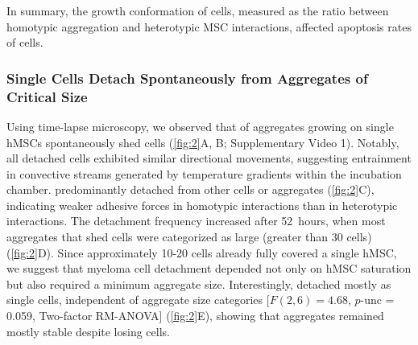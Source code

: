 In summary, the growth conformation of \INA cells, measured as the ratio between
homotypic aggregation and heterotypic MSC interactions, affected apoptosis rates
of \INA cells.



\subsubsection*{Single \INA Cells Detach Spontaneously from Aggregates of Critical Size}
Using time-lapse microscopy, we observed that  of
\INA aggregates growing on single hMSCs spontaneously shed \INA cells
(\autoref{fig:2}A, B; Supplementary Video 1). Notably, all detached cells
exhibited similar directional movements, suggesting entrainment in convective
streams generated by temperature gradients within the incubation chamber. \INA
predominantly detached from other \INA cells or aggregates (\autoref{fig:2}C),
indicating weaker adhesive forces in homotypic interactions than in heterotypic
interactions. The detachment frequency increased after \SI{52}{hours}, when most
aggregates that shed \INA cells were categorized as large (greater than 30
cells) (\autoref{fig:2}D). Since approximately 10-20 \INA cells already fully
covered a single hMSC, we suggest that myeloma cell detachment depended not only
on hMSC saturation but also required a minimum aggregate size. Interestingly,
\INA detached mostly as single cells, independent of aggregate size categories
[\(F(2, 6) = 4.68\), \(p\)-unc = 0.059, Two-factor RM-ANOVA] (\autoref{fig:2}E),
showing that aggregates remained mostly stable despite losing cells.


\label{fig:2}






